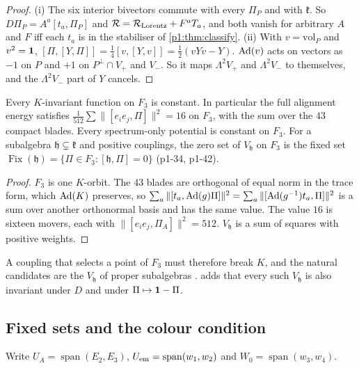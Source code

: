 \begin{proof}
(i) The six interior bivectors commute with every $\Pi_P$ and with $\mathfrak k$. So $D\Pi_P=A^a[t_a,\Pi_P]$ and $\mathcal R=\mathcal R_{\rm Lorentz}+F^aT_a$, and both vanish
for arbitrary $A$ and $F$ iff each $t_a$ is in the stabiliser of \cref{p1:thm:classify}. (ii) With $v=\mathrm{vol}_P$ and $v^2=\mathbf 1$,
$[\Pi,[Y,\Pi]]=\tfrac14[v,[Y,v]]=\tfrac12(vYv-Y)$. $\operatorname{Ad}(v)$ acts on vectors as $-1$ on $P$ and $+1$ on $P^\perp\cap V_+$ and $V_-$. So it maps $\Lambda^2V_+$ and
$\Lambda^2V_-$ to themselves, and the $\Lambda^2V_-$ part of $Y$ cancels.
\end{proof}

\begin{proposition}
\label{p1:prop:K}
Every $K$-invariant function on $F_3$ is constant. In particular the full alignment energy satisfies $\tfrac1{512}\sum\|[e_ie_j,\Pi]\|^2=16$ on $F_3$, with the sum over the $43$
compact blades. Every spectrum-only potential is constant on $F_3$. For a subalgebra $\mathfrak h\subsetneq\mathfrak k$ and positive couplings, the zero set of $V_{\mathfrak h}$ on
$F_3$ is the fixed set $\operatorname{Fix}(\mathfrak h)=\{\Pi\in F_3:[\mathfrak h,\Pi]=0\}$ (p1-34, p1-42).
\end{proposition}

\begin{proof}
$F_3$ is one $K$-orbit. The $43$ blades are orthogonal of equal norm in the trace form, which $\operatorname{Ad}(K)$ preserves, so $\sum_a\|[t_a,\operatorname{Ad}(g)\Pi]\|^2=\sum_a\|[\operatorname{Ad}(g^{-1})t_a,\Pi]\|^2$
is a sum over another orthonormal basis and has the same value. The value $16$ is sixteen movers, each with $\|[e_ie_j,\Pi_A]\|^2=512$. $V_{\mathfrak h}$ is a sum of
squares with positive weights.
\end{proof}

A coupling that selects a point of $F_3$ must therefore break $K$, and the natural candidates are the $V_{\mathfrak h}$ of proper subalgebras
\cite{Peskin80,Preskill81}.  adds that every such $V_{\mathfrak h}$ is also invariant under $D$ and under $\Pi\mapsto\mathbf 1-\Pi$.

\subsection{Fixed sets and the colour condition}
\label{p1:sec:fixed}

Write $U_A=\operatorname{span}(E_2,E_3)$, $U_{\rm em}=\operatorname{span}(w_1,w_2)$ and $W_0=\operatorname{span}(w_3,w_4)$.

